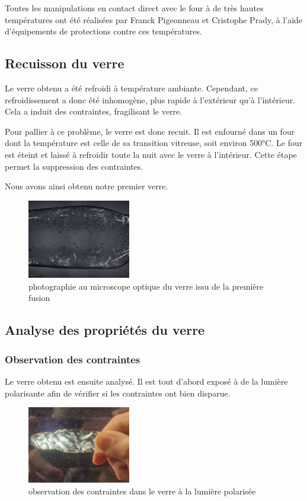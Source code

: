 \documentclass{article}
\begin{document}
Toutes les manipulations en contact direct avec le four à de très hautes températures ont été réalisées par Franck Pigeonneau et Cristophe Prady, à l'aide d'équipements de protections contre ces températures.

\subsection{Recuisson du verre}

Le verre obtenu a été refroidi à température ambiante. Cependant, ce refroidissement a donc été inhomogène, plus rapide à l'extérieur qu'à l'intérieur. Cela a induit des contraintes, fragilisant le verre.

Pour pallier à ce problème, le verre est donc recuit. Il est enfourné dans un four dont la température est celle de sa transition vitreuse, soit environ 500°C. Le four est éteint et laissé à refroidir toute la nuit avec le verre à l'intérieur.
Cette étape permet la suppression des contraintes.

Nous avons ainsi obtenu notre premier verre.

\begin{figure}[ht]
    \centering
    \includegraphics[width=0.4\textwidth]{photos/mosaic.jpg}
    \caption{photographie au microscope optique du verre issu de la première fusion}
\end{figure}

\subsection{Analyse des propriétés du verre}

\subsubsection{Observation des contraintes}
Le verre obtenu est ensuite analysé. Il est tout d'abord exposé à de la lumière polarisante afin de vérifier si les contraintes ont bien disparue.

\begin{figure}[ht]
    \centering
    \includegraphics[width=0.4\textwidth]{photos/contraintes.jpg}
    \caption{observation des contraintes dans le verre à la lumière polarisée}
\end{figure}
\end{document}
